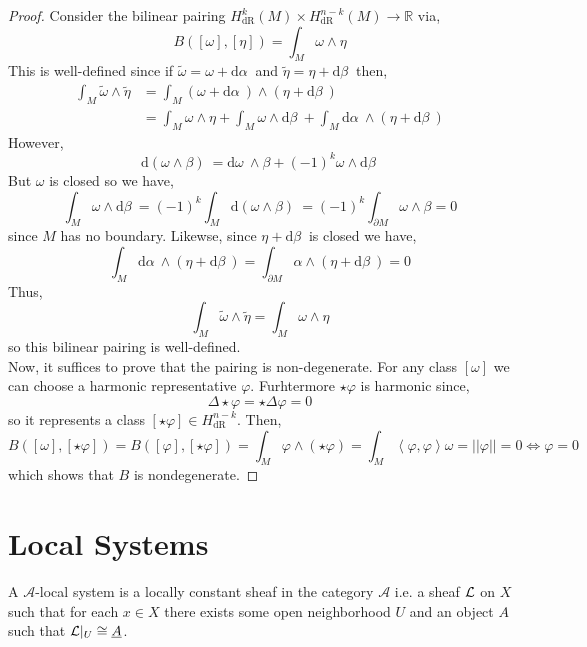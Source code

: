 \documentclass[12pt]{extarticle}
\newcommand{\R}{\mathbb{R}}
\renewcommand{\d}[1]{ \mathrm{d}#1 \:}
\theoremstyle{definition}
\newenvironment{definition}[1][Definition:]{\begin{trivlist}
\item[\hskip \labelsep {\bfseries #1}]}{\end{trivlist}}
\newcommand{\inner}[2]{\left< #1, #2 \right>}
\begin{document}
\begin{proof}
Consider the bilinear pairing $H^k_{\mathrm{dR}}(M) \times H^{n-k}_{\mathrm{dR}}(M) \to \R$ via,
\[ B([\omega], [\eta]) = \int_M \omega \wedge \eta \]
This is well-defined since if $\tilde{\omega} = \omega + \d{\alpha}$ and $\tilde{\eta} = \eta + \d{\beta}$ then,
\begin{align*}
\int_M \tilde{\omega} \wedge \tilde{\eta} & = \int_M (\omega + \d{\alpha}) \wedge (\eta  + \d{\beta}) 
\\
& = \int_M \omega \wedge \eta + \int_M \omega \wedge \d{\beta} + \int_M \d{\alpha} \wedge (\eta + \d{\beta}) 
\end{align*}
However,
\[ \d{(\omega \wedge \beta)} = \d{\omega} \wedge \beta + (-1)^k \omega \wedge
 \d{\beta} \]
But $\omega$ is closed so we have,
\[ \int_M \omega \wedge
 \d{\beta} = (-1)^k \int_M \d{(\omega \wedge \beta)} = (-1)^k \int_{\partial M} \omega \wedge \beta = 0 \]
since $M$ has no boundary. Likewse, since $\eta + \d{\beta}$ is closed we have,
\[ \int_M \d{\alpha} \wedge (\eta + \d{\beta}) = \int_{\partial M} \alpha \wedge (\eta + \d{\beta}) = 0 \]
Thus,
\[ \int_M \tilde{\omega} \wedge \tilde{\eta} = \int_M \omega \wedge \eta \]
so this bilinear pairing is well-defined. 
\bigskip\\
Now, it suffices to prove that the pairing is non-degenerate. For any class $[\omega]$ we can choose a harmonic representative $\varphi$. Furhtermore $\star \varphi$ is harmonic since,
\[ \Delta \star \varphi = \star \Delta \varphi = 0 \]
so it represents a class $[\star \varphi] \in H^{n-k}_{\text{dR}}$. Then,
\[ B([\omega], [\star \varphi]) = B([\varphi], [\star \varphi]) = \int_M \varphi \wedge (\star \varphi) = \int_M \inner{\varphi}{\varphi} \omega = || \varphi || = 0 \iff \varphi = 0 \]
which shows that $B$ is nondegenerate.
\end{proof}


\section{Local Systems}

\newcommand{\A}{\mathcal{A}}
\newcommand{\E}{\mathcal{E}}

\begin{definition}
A $\A$-local system is a locally constant sheaf in the category $\A$ i.e. a sheaf $\mathcal{L}$ on $X$ such that for each $x \in X$ there exists some open neighborhood $U$ and an object $A$ such that $\mathcal{L} |_U \cong \underline{A}$.
\end{definition}
\end{document}
